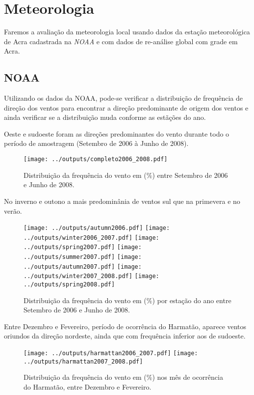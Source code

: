 \section{Meteorologia}

Faremos a avaliação da meteorologia local usando dados da estação meteorológica
de Acra cadastrada na \textit{NOAA} e com dados de re-análise global com grade
em Acra. 

\subsection{NOAA}
Utilizando os dados da NOAA, pode-se verificar a distribuição de frequência de
direção dos ventos para encontrar a direção predominante de origem dos ventos e 
ainda verificar se a distribuição muda conforme as estãções do ano.  


Oeste e sudoeste foram as direções predominantes do vento durante todo o período 
de amostragem (Setembro de 2006 à Junho de 2008).
 
\begin{figure}[H]
\begin{center}
  \texttt{[image: ../outputs/completo2006\_2008.pdf]}
  \caption{Distribuição da frequência do vento em (\%) entre
           Setembro de 2006 e Junho de 2008.}
\end{center}
\end{figure}


No inverno e outono a mais predominânia de ventos sul que na primevera 
e no verão. 

\begin{figure}[H]
\begin{center}
  \texttt{[image: ../outputs/autumn2006.pdf]}
  \texttt{[image: ../outputs/winter2006\_2007.pdf]}
  \texttt{[image: ../outputs/spring2007.pdf]}
  \texttt{[image: ../outputs/summer2007.pdf]}
  \texttt{[image: ../outputs/autumn2007.pdf]}
  \texttt{[image: ../outputs/winter2007\_2008.pdf]}
  \texttt{[image: ../outputs/spring2008.pdf]}
\end{center}
\caption{Distribuição da frequência do vento em (\%) por estação do ano entre
         Setembro de 2006 e Junho de 2008.}
\end{figure}

Entre Dezembro e Fevereiro, período de ocorrência do Harmatão, aparece 
ventos oriundos da direção nordeste, ainda que com frequência inferior 
aos de sudoeste.

\begin{figure}[H]
\begin{center}
  \texttt{[image: ../outputs/harmattan2006\_2007.pdf]}
  \texttt{[image: ../outputs/harmattan2007\_2008.pdf]}
\end{center}
\caption{Distribuição da frequência do vento em (\%) nos mês de ocorrência
         do Harmatão, entre Dezembro e Fevereiro.}
\end{figure}



